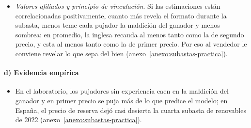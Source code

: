\documentclass[11pt]{article}
\begin{document}
\begin{itemize}
\begin{itemize}
  \item Siguiendo con la licencia del 5G, supongamos ahora que vale lo mismo para \textup{I}, E y O, por ejemplo 9, porque depende de cuántos clientes querrán el 5G, pero nadie lo sabe y cada uno lo estima con su propio estudio de mercado:
    \begin{itemize}
    \item los estudios no se equivocan de forma sistemática, pero cada uno se equivoca: el de \textup{I} dice 11; el de E, 10, y el de O, 6;
    \item si cada uno pujara su estimación en segundo precio, ganaría \textup{I}, el del estudio más optimista, y pagaría 10~por algo que vale 9: perdería 1;
    \item ganar es, en sí mismo, una mala noticia: quiere decir que los otros 2~estudios eran más pesimistas. «No es oro todo lo que reluce»;
    \item el operador sensato puja por debajo de lo que dice su estudio, y tanto más cuantos más rivales tiene.
    \end{itemize}
  \item \emph{Clásico: las licitaciones de petróleo del golfo de México}\nocite{CapenClappCampbell1971Competitive,Thaler1988Anomalies}: los yacimientos ganados rendían menos de lo esperado (anexo~\ref{anexo:clasicos}).
  \end{itemize}
\item \emph{Valores afiliados y principio de vinculación}\nocite{MilgromWeber1982Theory}. Si las estimaciones están correlacionadas positivamente, cuanto más revela el formato durante la subasta, menos teme cada pujador la maldición del ganador y menos sombrea: en promedio, la inglesa recauda al menos tanto como la de segundo precio, y esta al menos tanto como la de primer precio. Por eso al vendedor le conviene revelar lo que sepa del bien (anexo~\ref{anexo:subastas-practica}).
\end{itemize}

\paragraph{d) Evidencia empírica}

\begin{itemize}
\item En el laboratorio, los pujadores sin experiencia caen en la maldición del ganador y en primer precio se puja más de lo que predice el modelo\nocite{KagelLevin1986Winners,KagelLevin1993Independent}; en España, el precio de reserva dejó casi desierta la cuarta subasta de renovables de 2022\nocite{MITECO2022CuartaSubasta} (anexo~\ref{anexo:subastas-practica}).
\end{itemize}
\end{document}
